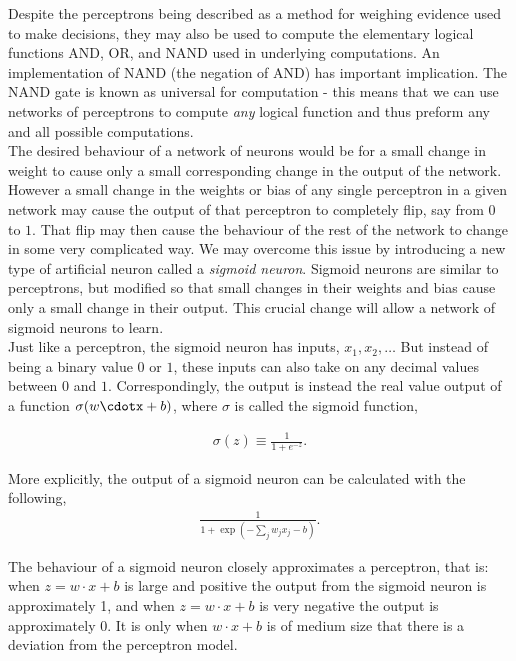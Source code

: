 \documentclass[12pt]{article}
\begin{document}
\noindent
Despite the perceptrons being described as a method for weighing evidence used to make decisions, they may also be used to compute the elementary logical functions AND, OR, and NAND used in underlying computations. An implementation of NAND (the negation of AND) has important implication. The NAND gate is known as universal for computation - this means that we can use networks of perceptrons to compute \textit{any} logical function and thus preform any and all possible computations.
\\

\noindent
The desired behaviour of a network of neurons would be for a small change in weight to cause only a small corresponding change in the output of the network. However a small change in the weights or bias of any single perceptron in a given network may cause the output of that perceptron to completely flip, say from $0$ to $1$. That flip may then cause the behaviour of the rest of the network to change in some very complicated way. We may overcome this issue by introducing a new type of artificial neuron called a \textit{sigmoid neuron}. Sigmoid neurons are similar to perceptrons, but modified so that small changes in their weights and bias cause only a small change in their output. This crucial change will allow a network of sigmoid neurons to learn.
\\

\noindent
Just like a perceptron, the sigmoid neuron has inputs, $x_1,x_2, \dots$ But instead of being a binary value $0$ or $1$, these inputs can also take on any decimal values between $0$ and $1$. Correspondingly, the output is instead the real value output of a function $\sigma(w\cdotx+b)$, where $\sigma$ is called the sigmoid function,

\begin{eqnarray} 
  \sigma(z) \equiv \frac{1}{1+e^{-z}}.
\end{eqnarray}

\noindent
More explicitly, the output of a sigmoid neuron can be calculated with the following,
\begin{eqnarray} 
  \frac{1}{1+\exp(-\sum_j w_j x_j-b)}.
\end{eqnarray}

\noindent
The behaviour of a sigmoid neuron closely approximates a perceptron, that is: when $z = w \cdot x + b$ is large and positive the output from the sigmoid neuron is approximately 1, and when $z = w \cdot x + b$ is very negative the output is approximately 0. It is only when $w \cdot x+b$ is of medium size that there is a deviation from the perceptron model.
\\
\end{document}
